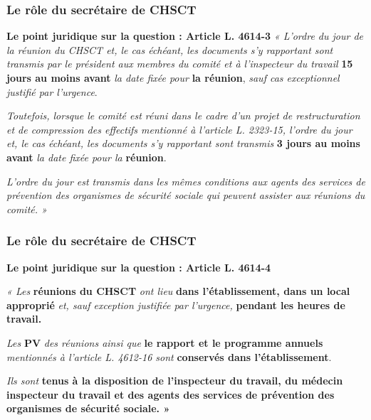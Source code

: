 \documentclass{beamer}
\begin{document}
\begin{frame}
\frametitle{Le rôle du secrétaire de CHSCT}

\textbf{Le point juridique sur la question : Article L. 4614-3}
\textit{« L'ordre du jour de la réunion du CHSCT et, le cas échéant, les documents s'y rapportant sont transmis par le président aux membres du comité et à l'inspecteur du travail} \textbf{15 jours au moins avant} \textit{la date fixée pour} \textbf{la réunion}, \textit{sauf cas exceptionnel justifié par l'urgence}.

\textit{Toutefois, lorsque le comité est réuni dans le cadre d'un projet de restructuration et de compression des effectifs mentionné à l'article L. 2323-15, l'ordre du jour et, le cas échéant, les documents s'y rapportant sont transmis} \textbf{3 jours au moins avant} \textit{la date fixée pour la} \textbf{réunion}.

\textit{L'ordre du jour est transmis dans les mêmes conditions aux agents des services de prévention des organismes de sécurité sociale qui peuvent assister aux réunions du comité. »}
\end{frame}

\begin{frame}
\frametitle{Le rôle du secrétaire de CHSCT}

\textbf{Le point juridique sur la question : Article L. 4614-4}

\textit{« Les} \textbf{réunions du CHSCT} \textit{ont lieu} \textbf{dans l'établissement, dans un local approprié} \textit{et, sauf exception justifiée par l'urgence,} \textbf{pendant les heures de travail.}

\textit{Les} \textbf{PV} \textit{des réunions ainsi que} \textbf{le rapport et le programme annuels} \textit{mentionnés à l'article L. 4612-16 sont} \textbf{conservés dans l'établissement}. 

\textit{Ils sont} \textbf{tenus à la disposition de l'inspecteur du travail, du médecin inspecteur du travail et des agents des services de prévention des organismes de sécurité sociale. »}
\end{frame}
\end{document}
